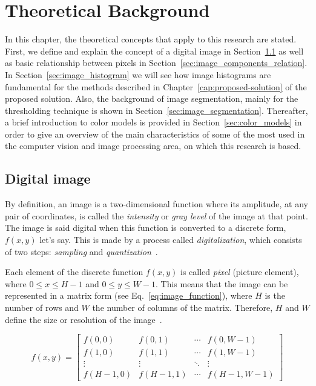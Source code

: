 \chapter{Theoretical Background}
\label{cap:conceitos}
In this chapter, the theoretical concepts that apply to this research are stated. First, we define and explain the concept of a digital image in Section~\ref{sec:digital_image} as well as basic relationship between pixels in Section~\ref{sec:image_components_relation}. In Section~\ref{sec:image_histogram} we will see how image histograms are fundamental for the methods described in Chapter~\ref{cap:proposed-solution} of the proposed solution. Also, the background of image segmentation, mainly for the thresholding technique is shown in Section~\ref{sec:image_segmentation}. Thereafter, a brief introduction to color models is provided in Section~\ref{sec:color_models} in order to give an overview of the main characteristics of some of the most used in the computer vision and image processing area, on which this research is based.

\section{Digital image}
\label{sec:digital_image}
By definition, an image is a two-dimensional function where its amplitude, at any pair of coordinates, is called the \textit{intensity} or \textit{gray level} of the image at that point. The image is said digital when this function is converted to a discrete form, $f(x, y)$ let's say. This is made by a process called \textit{digitalization}, which consists of two steps: \textit{sampling} and \textit{quantization}~\citep{gonzalez:02}.

Each element of the discrete function $f(x, y)$ is called \textit{pixel} (picture element), where $0 \leq x \leq H - 1$ and $0 \leq y \leq W - 1$. This means that the image can be represented in a matrix form (see Eq.~\ref{eq:image_function}), where $H$ is the number of rows and $W$ the number of columns of the matrix. Therefore, $H$ and $W$ define the size or resolution of the image~\citep{pedrini:08}.

\begin{equation}
f(x, y) =
 \begin{bmatrix}
  f(0, 0)     & f(0, 1)     & \cdots & f(0, W - 1) \\
  f(1, 0)     & f(1, 1)     & \cdots & f(1, W - 1) \\
  \vdots      & \vdots      & \ddots & \vdots  \\
  f(H - 1, 0) & f(H - 1, 1) & \cdots & f(H - 1, W - 1)
 \end{bmatrix}
\label{eq:image_function}
\end{equation}

